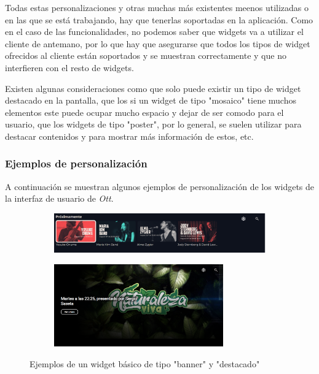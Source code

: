 Todas estas personalizaciones y otras muchas más existentes meenos utilizadas o en las que se está trabajando, hay que tenerlas soportadas en la aplicación. 
Como en el caso de las funcionalidades, no podemos saber que widgets va a utilizar el cliente de antemano, por lo que hay que asegurarse que todos los tipos 
de widget ofrecidos al cliente están soportados y se muestran correctamente y que no interfieren con el resto de widgets. 

Existen algunas consideraciones como que solo puede existir un tipo de widget destacado en la pantalla, que los si un widget de tipo "mosaico" tiene muchos
elementos este puede ocupar mucho espacio y dejar de ser comodo para el usuario, que los widgets de tipo "poster", por lo general, se suelen utilizar para
destacar contenidos y para mostrar más información de estos, etc.

\subsubsection{Ejemplos de personalización}
\label{sec:diseno-ux-ejemplos}

A continuación se muestran algunos ejemplos de personalización de los widgets de la interfaz de usuario de \textit{Ott}.


\begin{figure}[H]
    \begin{subfigure}[c]{0.5\textwidth}
        \includegraphics[width=\textwidth]{imaxes/Widget_banner.png}
        \label{fig:Widget_banner}
    \end{subfigure}
    \hspace{0.1\textwidth}
    \begin{subfigure}[c]{0.5\textwidth}
        \includegraphics[width=0.8\textwidth]{imaxes/Widget_destacado.png}
        \label{fig:Widget_destacado}
    \end{subfigure}
    \caption{Ejemplos de un widget básico de tipo "banner" y "destacado"}
    \label{fig:Widget_banner_destacado}
\end{figure}

